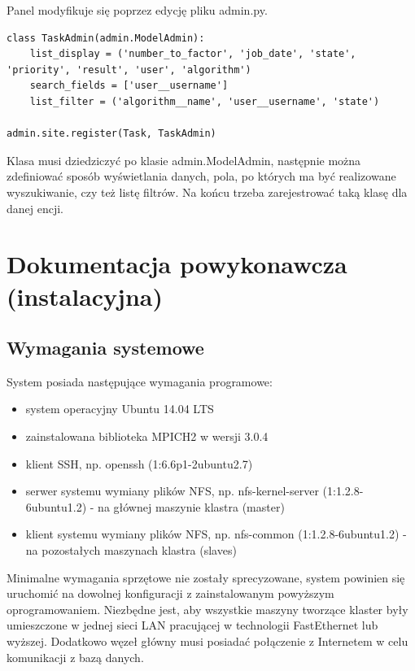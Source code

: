 \documentclass{article}
\begin{document}
Panel modyfikuje się poprzez edycję pliku admin.py.

\begin{lstlisting}
class TaskAdmin(admin.ModelAdmin):
    list_display = ('number_to_factor', 'job_date', 'state', 'priority', 'result', 'user', 'algorithm')
    search_fields = ['user__username']
    list_filter = ('algorithm__name', 'user__username', 'state')

admin.site.register(Task, TaskAdmin)
\end{lstlisting}

Klasa musi dziedziczyć po klasie admin.ModelAdmin, następnie można zdefiniować sposób wyświetlania danych, pola, po których ma być realizowane wyszukiwanie, czy też listę filtrów. Na końcu trzeba zarejestrować taką klasę dla danej encji.

\newpage
\section{Dokumentacja powykonawcza (instalacyjna)}
 
\subsection{Wymagania systemowe}

System posiada następujące wymagania programowe:
\begin{itemize}
\item system operacyjny Ubuntu 14.04 LTS
\item zainstalowana biblioteka MPICH2 w wersji 3.0.4
\item klient SSH, np. openssh (1:6.6p1-2ubuntu2.7)
\item serwer systemu wymiany plików NFS, np. nfs-kernel-server (1:1.2.8-6ubuntu1.2) - na głównej maszynie klastra (master)
\item klient systemu wymiany plików NFS, np. nfs-common (1:1.2.8-6ubuntu1.2) - na pozostałych maszynach klastra (slaves)
\end{itemize}
 
Minimalne wymagania sprzętowe nie zostały sprecyzowane, system powinien się uruchomić na dowolnej konfiguracji z zainstalowanym powyższym oprogramowaniem. Niezbędne jest, aby wszystkie maszyny tworzące klaster były umieszczone w jednej sieci LAN pracującej w technologii FastEthernet lub wyższej. Dodatkowo węzeł główny musi posiadać połączenie z Internetem w celu komunikacji z bazą danych.
\end{document}
